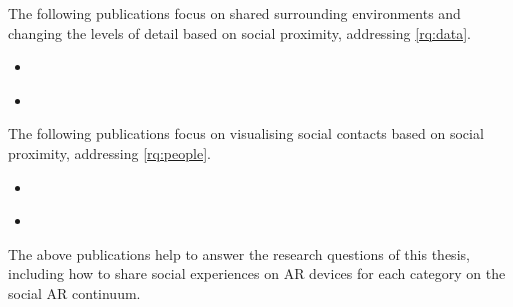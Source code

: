 The following publications focus on shared surrounding environments and changing the levels of detail based on social proximity, addressing \ref{rq:data}.

\begin{itemize}
    \item{ }
    \item{ }
\end{itemize}

The following publications focus on visualising social contacts based on social proximity, addressing \ref{rq:people}. 

\begin{itemize}
    \item{ }
    \item{ }
\end{itemize}

The above publications help to answer the research questions of this thesis, including how to share social experiences on AR devices for each category on the social AR continuum. 

